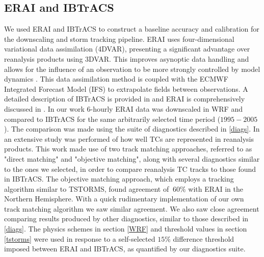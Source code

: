 \subsection{ERAI and IBTrACS}
\label{erai}
We used ERAI and IBTrACS to construct a baseline accuracy and calibration for the downscaling and storm tracking pipeline. ERAI uses four-dimensional variational data assimilation (4DVAR), presenting a significant advantage over reanalysis products using 3DVAR. This improves asynoptic data handling and allows for the influence of an observation to be more strongly controlled by model dynamics \cite{tc_reanal:2}. This data assimilation method is coupled with the ECMWF Integrated Forecast Model (IFS) to extrapolate fields between observations. A detailed description of IBTrACS is provided in \cite{ibtracs} and ERAI is comprehensively discussed in \cite{erai_reanal}. In our work $6$-hourly ERAI data was downscaled in WRF and compared to IBTrACS for the same arbitrarily selected time period ($1995-2005$). The comparison was made using the suite of diagnostics described in \ref{diags}. In \cite{tc_reanal:1} an extensive study was performed of how well TCs are represented in reanalysis products. This work made use of two track matching approaches, referred to as "direct matching" and "objective matching", along with several diagnostics similar to the ones we selected, in order to compare reanalysis TC tracks to those found in IBTrACS. The objective matching approach, which employs a tracking algorithm similar to TSTORMS, found agreement of $~60\%$ with ERAI in the Northern Hemisphere. With a quick rudimentary implementation of our own track matching algorithm we saw similar agreement. We also saw close agreement comparing results produced by other diagnostics, similar to those described in \ref{diags}. The physics schemes in section \ref{WRF} and threshold values in section \ref{tstorms} were used in response to a self-selected $15\%$ difference threshold imposed between ERAI and IBTrACS, as quantified by our diagnostics suite.      

